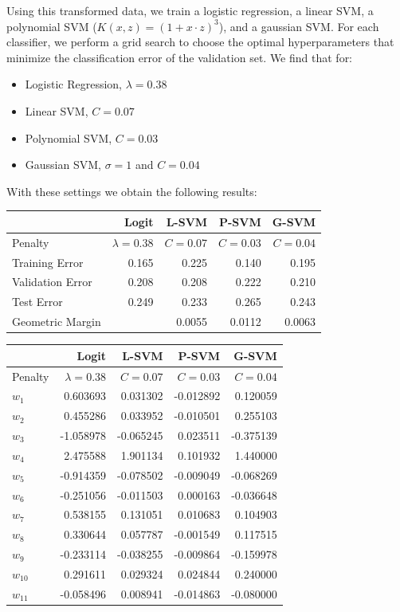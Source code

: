 \documentclass[10pt]{article}
\begin{document}
Using this transformed data, we train a logistic regression, a linear SVM, a polynomial SVM ($K(x,z) = (1+x\cdot z)^3$), and a gaussian SVM. For each classifier, we perform a grid search to choose the optimal hyperparameters that minimize the classification error of the validation set. We find that for:
\begin{itemize}
	\item Logistic Regression, $\lambda = 0.38$
	\item Linear SVM, $C = 0.07$
	\item Polynomial SVM, $C=0.03$
	\item Gaussian SVM, $\sigma = 1$ and $C=0.04$
\end{itemize} 

With these settings we obtain the following results:
\begin{table}[ht]
\centering
{}
\begin{tabular}{lrrrr}
\toprule
{} & Logit & L-SVM & P-SVM & G-SVM \\
\midrule
Penalty & $\lambda = 0.38$ & $C = 0.07$ & $C = 0.03$ & $C = 0.04$\\
\midrule
Training Error    &  0.165 &  0.225 & 0.140 &  0.195 \\
Validation Error  &  0.208 &  0.208 & 0.222 &  0.210 \\
Test Error        &  0.249 &  0.233 & 0.265 &  0.243 \\
Geometric Margin  & {}     &  0.0055& 0.0112& 0.0063 \\
\bottomrule
\end{tabular}	
\end{table}

\begin{table}[ht]
\centering
{}
\begin{tabular}{lrrrr}
\toprule
{} & Logit & L-SVM & P-SVM & G-SVM \\
\midrule
Penalty & $\lambda = 0.38$ & $C = 0.07$ & $C = 0.03$ & $C = 0.04$\\
\midrule
$w_1$  &  0.603693 &  0.031302 & -0.012892 &  0.120059 \\
$w_2$  &  0.455286 &  0.033952 & -0.010501 &  0.255103 \\
$w_3$  & -1.058978 & -0.065245 &  0.023511 & -0.375139 \\
$w_4$  &  2.475588 &  1.901134 &  0.101932 &  1.440000 \\
$w_5$  & -0.914359 & -0.078502 & -0.009049 & -0.068269 \\
$w_6$  & -0.251056 & -0.011503 &  0.000163 & -0.036648 \\
$w_7$  &  0.538155 &  0.131051 &  0.010683 &  0.104903 \\
$w_8$  &  0.330644 &  0.057787 & -0.001549 &  0.117515 \\
$w_9$  & -0.233114 & -0.038255 & -0.009864 & -0.159978 \\
$w_{10}$ &  0.291611 &  0.029324 &  0.024844 &  0.240000 \\
$w_{11}$ & -0.058496 &  0.008941 & -0.014863 & -0.080000 \\
\bottomrule
\end{tabular}	
\end{table}
\end{document}
